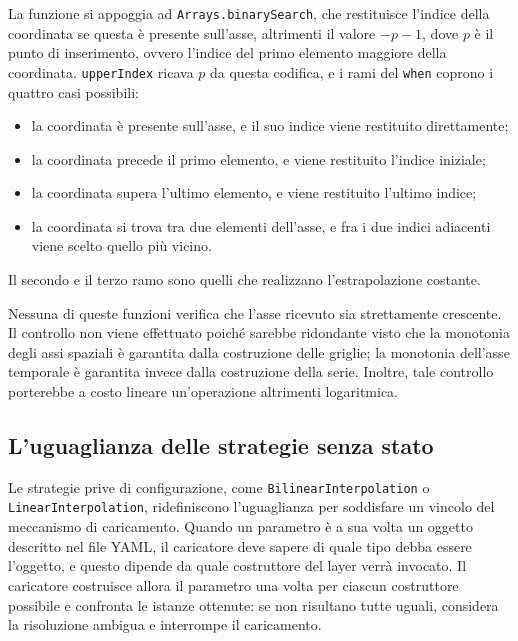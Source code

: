

La funzione si appoggia ad \texttt{Arrays.binarySearch}, che restituisce l'indice della
coordinata se questa è presente sull'asse, altrimenti il valore $-p-1$, dove $p$ è il
punto di inserimento, ovvero l'indice del primo elemento maggiore della coordinata.
\texttt{upperIndex} ricava $p$ da questa codifica, e i rami del \texttt{when} coprono i
quattro casi possibili:

\begin{itemize}
    \item la coordinata è presente sull'asse, e il suo indice viene restituito direttamente;
    \item la coordinata precede il primo elemento, e viene restituito l'indice
    iniziale;
    \item la coordinata supera l'ultimo elemento, e viene restituito l'ultimo indice;
    \item la coordinata si trova tra due elementi dell'asse, e fra i due indici adiacenti viene scelto quello
    più vicino.
\end{itemize}

Il secondo e il terzo ramo sono quelli che realizzano l'estrapolazione costante.

Nessuna di queste funzioni verifica che l'asse ricevuto sia strettamente crescente. 
Il controllo non viene effettuato poiché sarebbe ridondante visto che la monotonia
degli assi spaziali è garantita dalla costruzione delle griglie; la monotonia dell'asse
temporale è garantita invece dalla costruzione della serie. Inoltre,
tale controllo porterebbe a costo lineare un'operazione altrimenti logaritmica.

\subsection{L'uguaglianza delle strategie senza stato}
\label{subsec:composizione-impl}

Le strategie prive di configurazione, come \texttt{BilinearInterpolation} o
\texttt{LinearInterpolation}, ridefiniscono l'uguaglianza per soddisfare un vincolo del
meccanismo di caricamento. Quando un parametro è a sua volta un oggetto descritto nel file
YAML, il caricatore deve sapere di quale tipo debba essere l'oggetto, e questo dipende da
quale costruttore del layer verrà invocato. Il caricatore costruisce allora il parametro
una volta per ciascun costruttore possibile e confronta le istanze ottenute: se non
risultano tutte uguali, considera la risoluzione ambigua e interrompe il caricamento.
 
